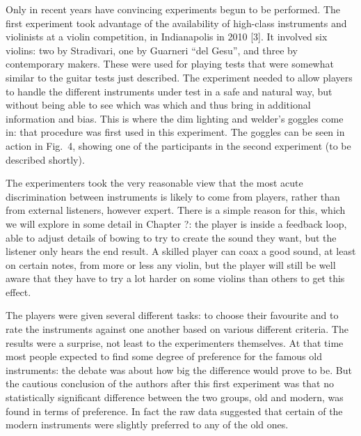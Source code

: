   Only in recent years have convincing experiments begun to be performed. The 
  first experiment took advantage of the availability of high-class instruments 
  and violinists at a violin competition, in Indianapolis in 2010 [3]. It 
  involved six violins: two by Stradivari, one by Guarneri “del Gesu”, and 
  three by contemporary makers. These were used for playing tests that were 
  somewhat similar to the guitar tests just described. The experiment needed to 
  allow players to handle the different instruments under test in a safe and 
  natural way, but without being able to see which was which and thus bring in 
  additional information and bias. This is where the dim lighting and welder’s 
  goggles come in: that procedure was first used in this experiment. The 
  goggles can be seen in action in Fig.\ 4, showing one of the participants in 
  the second experiment (to be described shortly). 


  The experimenters took the very reasonable view that the most acute 
  discrimination between instruments is likely to come from players, rather 
  than from external listeners, however expert. There is a simple reason for 
  this, which we will explore in some detail in Chapter ?: the player is inside 
  a feedback loop, able to adjust details of bowing to try to create the sound 
  they want, but the listener only hears the end result. A skilled player can 
  coax a good sound, at least on certain notes, from more or less any violin, 
  but the player will still be well aware that they have to try a lot harder on 
  some violins than others to get this effect. 

  The players were given several different tasks: to choose their favourite and 
  to rate the instruments against one another based on various different 
  criteria. The results were a surprise, not least to the experimenters 
  themselves. At that time most people expected to find some degree of 
  preference for the famous old instruments: the debate was about how big the 
  difference would prove to be. But the cautious conclusion of the authors 
  after this first experiment was that no statistically significant difference 
  between the two groups, old and modern, was found in terms of preference. In 
  fact the raw data suggested that certain of the modern instruments were 
  slightly preferred to any of the old ones. 

